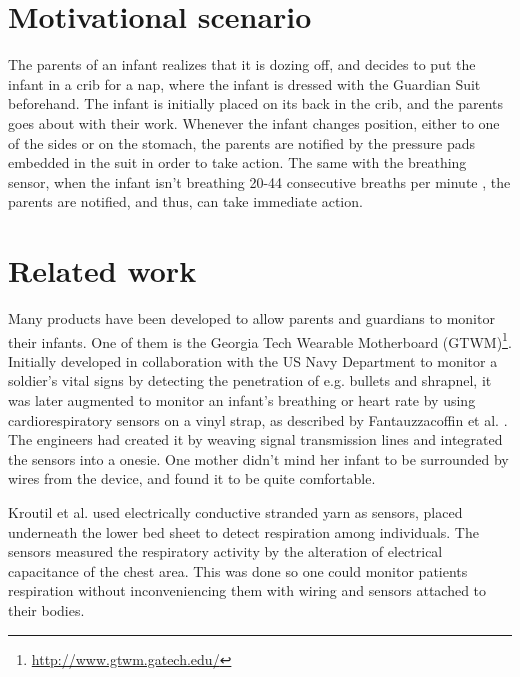 \documentclass{sigchi-ext}
\begin{document}

\section{Motivational scenario}
The parents of an infant realizes that it is dozing off, and decides to put the infant in a crib for a nap, where the infant is dressed with the Guardian Suit beforehand. The infant is initially placed on its back in the crib, and the parents goes about with their work. Whenever the infant changes position, either to one of the sides or on the stomach, the parents are notified by the pressure pads embedded in the suit in order to take action. The same with the breathing sensor, when the infant isn't breathing 20-44 consecutive breaths per minute \cite{a18-huang}, the parents are notified, and thus, can take immediate action.

\clearpage

\section{Related work}
Many products have been developed to allow parents and guardians to monitor their infants. One of them is the Georgia Tech Wearable Motherboard (GTWM)\footnote{\label{gtwm} \url{http://www.gtwm.gatech.edu/}}. Initially developed in collaboration with the US Navy Department to monitor a soldier's vital signs by detecting the penetration of e.g. bullets and shrapnel, it was later augmented to monitor an infant's breathing or heart rate by using cardiorespiratory sensors on a vinyl strap, as described by Fantauzzacoffin et al. \cite{p285-fantauzzacoffin}. The engineers had created it by weaving signal transmission lines and integrated the sensors into a onesie. One mother didn't mind her infant to be surrounded by wires from the device, and found it to be quite comfortable.

Kroutil et al. \cite{a33-kroutil} used electrically conductive stranded yarn as sensors, placed underneath the lower bed sheet to detect respiration among individuals. The sensors measured the respiratory activity by the alteration of electrical capacitance of the chest area. This was done so one could monitor patients respiration without inconveniencing them with wiring and sensors attached to their bodies.
\end{document}
